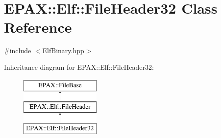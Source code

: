 \hypertarget{class_e_p_a_x_1_1_elf_1_1_file_header32}{\section{\-E\-P\-A\-X\-:\-:\-Elf\-:\-:\-File\-Header32 \-Class \-Reference}
\label{class_e_p_a_x_1_1_elf_1_1_file_header32}
}


{\ttfamily \#include $<$\-Elf\-Binary.\-hpp$>$}

\-Inheritance diagram for \-E\-P\-A\-X\-:\-:\-Elf\-:\-:\-File\-Header32\-:\begin{figure}[H]
\begin{center}
\leavevmode
\includegraphics[height=3.000000cm]{class_e_p_a_x_1_1_elf_1_1_file_header32}
\end{center}
\end{figure}
